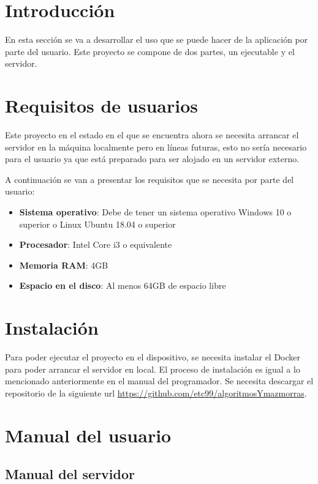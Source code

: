 
\section{Introducción}
En esta sección se va a desarrollar el uso que se puede hacer de la aplicación por parte del usuario.
Este proyecto se compone de dos partes, un ejecutable y el servidor. 

\section{Requisitos de usuarios}

Este proyecto en el estado en el que se encuentra ahora se necesita arrancar el servidor en la máquina localmente pero en líneas futuras, esto no sería necesario para el usuario ya que está preparado para ser alojado en un servidor externo.

A continuación se van a presentar los requisitos que se necesita por parte del usuario: 
\begin{itemize}
    \item \textbf{Sistema operativo}: Debe de tener un sistema operativo Windows 10 o superior o Linux Ubuntu 18.04 o superior
    \item \textbf{Procesador}: Intel Core i3 o equivalente
    \item \textbf{Memoria RAM}: 4GB
    \item \textbf{Espacio en el disco}: Al menos 64GB de espacio libre
\end{itemize}

\section{Instalación}

Para poder ejecutar el proyecto en el dispositivo, se necesita instalar el Docker para poder arrancar el servidor en local. El proceso de instalación es igual a lo mencionado anteriormente en el manual del programador.
Se necesita descargar el repositorio de la siguiente url \url{https://github.com/etc99/algoritmosYmazmorras}.

\section{Manual del usuario}

\subsection{Manual del servidor}

